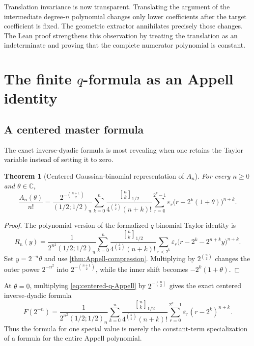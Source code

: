 \documentclass[11pt,oneside]{article}
\newtheorem{theorem}{Theorem}[section]
\theoremstyle{definition}
\theoremstyle{remark}
\newcommand{\C}{\mathbb C}
\newcommand{\eps}{\varepsilon}
\newcommand{\poch}[3]{\left(#1;#2\right)_{#3}}
\newcommand{\qbinom}[3]{\genfrac{[}{]}{0pt}{}{#1}{#2}_{#3}}
\begin{document}
Translation invariance is now transparent.  Translating the argument of the
intermediate degree-$n$ polynomial changes only lower coefficients after the
target coefficient is fixed.  The geometric extractor annihilates precisely
those changes.  The Lean proof strengthens this observation by treating the
translation as an indeterminate and proving that the complete numerator
polynomial is constant.

\section{The finite $q$-formula as an Appell identity}

\subsection{A centered master formula}

The exact inverse-dyadic formula is most revealing when one retains the Taylor
variable instead of setting it to zero.

\begin{theorem}[Centered Gaussian-binomial representation of $A_n$]
\label{thm:centered-q-Appell}
For every $n\ge0$ and $\theta\in\C$,
\begin{equation}\label{eq:centered-q-Appell}
\boxed{
 \frac{A_n(\theta)}{n!}
 =\frac{2^{-\binom{n+1}{2}}}{\poch{1/2}{1/2}{n}}
 \sum_{k=0}^{n}
 \frac{\qbinom{n}{k}{1/2}}
 {4^{\binom k2}(n+k)!}
 \sum_{r=0}^{2^k-1}
 \eps_r\bigl(r-2^k(1+\theta)\bigr)^{n+k}.}
\end{equation}
\end{theorem}

\begin{proof}
The polynomial version of the formalized $q$-binomial Taylor identity is
\[
 R_n(y)=
 \frac1{2^{n^2}\poch{1/2}{1/2}{n}}
 \sum_{k=0}^{n}
 \frac{\qbinom{n}{k}{1/2}}
 {4^{\binom k2}(n+k)!}
 \sum_{r<2^k}\eps_r
 \bigl(r-2^k-2^{n+k}y\bigr)^{n+k}.
\]
Set $y=2^{-n}\theta$ and use
\cref{thm:Appell-compression}.  Multiplying by $2^{\binom n2}$ changes the
outer power $2^{-n^2}$ into $2^{-\binom{n+1}{2}}$, while the inner shift becomes
$-2^k(1+\theta)$.
\end{proof}

At $\theta=0$, multiplying \eqref{eq:centered-q-Appell} by
$2^{-\binom n2}$ gives the exact centered inverse-dyadic formula
\begin{equation}\label{eq:centered-inverse-dyadic}
 \boxed{
 F(2^{-n})
 =\frac1{2^{n^2}\poch{1/2}{1/2}{n}}
 \sum_{k=0}^{n}
 \frac{\qbinom{n}{k}{1/2}}
 {4^{\binom k2}(n+k)!}
 \sum_{r=0}^{2^k-1}
 \eps_r(r-2^k)^{n+k}.}
\end{equation}
Thus the formula for one special value is merely the constant-term
specialization of a formula for the entire Appell polynomial.
\end{document}

